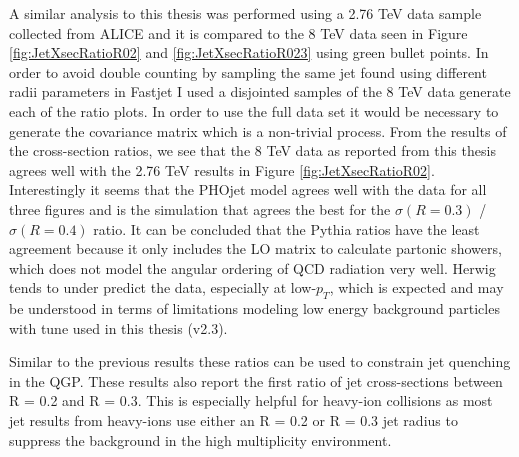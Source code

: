 

A similar analysis to this thesis was performed using a 2.76 TeV  data sample collected from ALICE\cite{MA2013319} and it is compared to the 8 TeV data seen in Figure \ref{fig:JetXsecRatioR02} and \ref{fig:JetXsecRatioR023} using green bullet points.  
In order to avoid double counting by sampling the same jet found using different radii parameters in Fastjet I used a disjointed samples of the 8 TeV data generate each of the ratio plots.  In order to use the full data set it would be necessary to generate the covariance matrix which is a non-trivial process.   From the results of the cross-section ratios, we see that the 8 TeV data as reported from this thesis agrees well with the 2.76 TeV results in Figure \ref{fig:JetXsecRatioR02}.  Interestingly it seems that the PHOjet model agrees well with the data for all three figures and is the simulation that agrees the best for the $\sigma (R = 0.3)$ / $\sigma (R = 0.4)$ ratio.  It can be concluded that the Pythia ratios have the least agreement because it only includes the LO matrix to calculate partonic showers, which does not model the angular ordering of QCD radiation very well.  Herwig tends to under predict the data, especially at low-$p_{T}$, which is expected and may be understood in terms of limitations modeling low energy background particles with tune used in this thesis (v2.3).  

Similar to the previous results these ratios can be used to constrain jet quenching in the QGP.  These results also report the first ratio of jet cross-sections between R = 0.2 and R = 0.3.  This is especially helpful for heavy-ion collisions as most jet results from heavy-ions use either an R = 0.2 or R = 0.3 jet radius to suppress the background in the high multiplicity environment.


